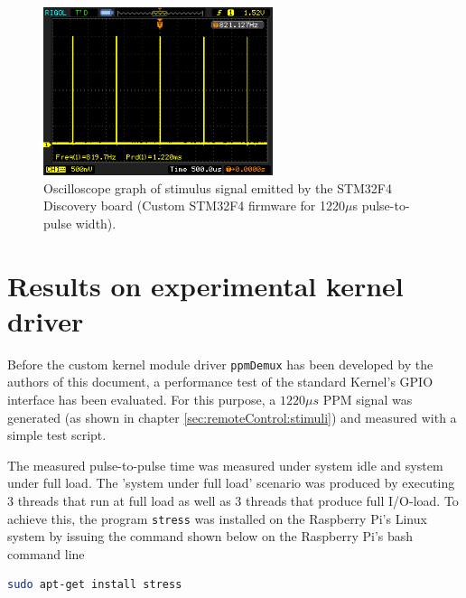\begin{figure}[H]
    \centering
    \includegraphics[width=0.60\textwidth]{fig/ch-ppm-kernel-driver/osci_ppm_1220us}
    \caption[Oscilloscope graph of stimulus signal (1220$\mu$s)]{Oscilloscope graph of stimulus signal emitted by the STM32F4 Discovery board (Custom STM32F4 firmware for 1220$\mu$s pulse-to-pulse width).}
    \label{fig:remoteControl:stimuli:oszi1220}
\end{figure}

\section{Results on experimental kernel driver}
\label{sec:remoteControl:results}

Before the custom kernel module driver \texttt{ppmDemux} has been developed by the authors of this document, a performance test of the standard Kernel's GPIO interface has been evaluated. For this purpose, a $1220\mu s$ PPM signal was generated (as shown in chapter \ref{sec:remoteControl:stimuli}) and measured with a simple test script.

The measured pulse-to-pulse time was measured under system idle and system under full load. The 'system under full load' scenario was produced by executing 3 threads that run at full load as well as 3 threads that produce full I/O-load. To achieve this, the program \texttt{stress} was installed on the Raspberry Pi's Linux system by issuing the command shown below on the Raspberry Pi's bash command line
\begin{lstlisting}[language=bash,otherkeywords={sudo,tar,touch,gedit,cp,apt-get,mkdir}]
sudo apt-get install stress
\end{lstlisting}

